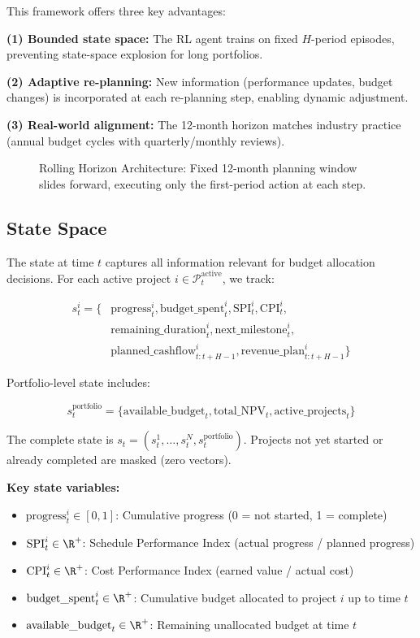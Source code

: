This framework offers three key advantages:

\textbf{(1) Bounded state space:} The RL agent trains on fixed $H$-period episodes, preventing state-space explosion for long portfolios.

\textbf{(2) Adaptive re-planning:} New information (performance updates, budget changes) is incorporated at each re-planning step, enabling dynamic adjustment.

\textbf{(3) Real-world alignment:} The 12-month horizon matches industry practice (annual budget cycles with quarterly/monthly reviews).

\begin{figure}[h]
\centering
\resizebox{0.9\columnwidth}{!}{}
\caption{Rolling Horizon Architecture: Fixed 12-month planning window slides forward, executing only the first-period action at each step.}
\label{fig:rolling_horizon}
\end{figure}

\subsection{State Space}

The state at time $t$ captures all information relevant for budget allocation decisions. For each active project $i \in \mathcal{P}_t^{\text{active}}$, we track:

\begin{align}
s_t^i = \{&\text{progress}_t^i, \text{budget\_spent}_t^i, \text{SPI}_t^i, \text{CPI}_t^i, \nonumber \\
&\text{remaining\_duration}_t^i, \text{next\_milestone}_t^i, \nonumber \\
&\text{planned\_cashflow}_{t:t+H-1}^i, \text{revenue\_plan}_{t:t+H-1}^i\}
\end{align}

Portfolio-level state includes:

\begin{equation}
s_t^{\text{portfolio}} = \{\text{available\_budget}_t, \text{total\_NPV}_t, \text{active\_projects}_t\}
\end{equation}

The complete state is $s_t = (s_t^1, \ldots, s_t^N, s_t^{\text{portfolio}})$. Projects not yet started or already completed are masked (zero vectors).

\textbf{Key state variables:}

\begin{itemize}
    \item $\text{progress}_t^i \in [0, 1]$: Cumulative progress (0 = not started, 1 = complete)
    \item $\text{SPI}_t^i \in \R^+$: Schedule Performance Index (actual progress / planned progress)
    \item $\text{CPI}_t^i \in \R^+$: Cost Performance Index (earned value / actual cost)
    \item $\text{budget\_spent}_t^i \in \R^+$: Cumulative budget allocated to project $i$ up to time $t$
    \item $\text{available\_budget}_t \in \R^+$: Remaining unallocated budget at time $t$
\end{itemize}


